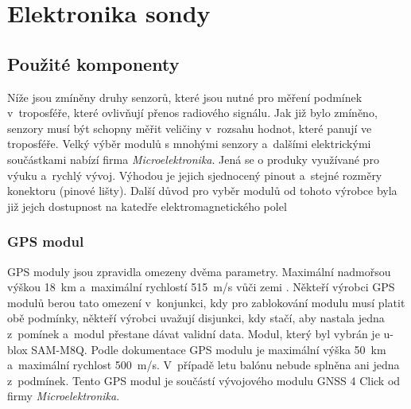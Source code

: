 \documentclass[twoside]{ctuthesis}
\theoremstyle{plain}
\theoremstyle{definition}
\theoremstyle{note}
\begin{document}
	\section{Elektronika sondy}

		\subsection{Použité komponenty}
		Níže jsou zmíněny druhy senzorů, které jsou nutné pro měření podmínek v~troposféře, které ovlivňují přenos radiového signálu. Jak již bylo zmíněno, senzory musí být schopny měřit veličiny v~rozsahu hodnot, které panují ve troposféře. Velký výběr modulů s mnohými senzory a~dalšími elektrickými součástkami nabízí firma \textit{Microelektronika}. Jená se o produky využívané pro výuku a~rychlý vývoj. Výhodou je jejich sjednocený pinout a~stejné rozměry konektoru (pinové lišty). Další důvod pro vyběr modulů od tohoto výrobce byla již jejch dostupnost na katedře elektromagnetického polel

			\subsubsection{GPS modul}
			GPS moduly jsou zpravidla omezeny dvěma parametry. Maximální nadmořsou výškou 18~km a~maximální rychlostí 515~m/s vůči zemi . Někteří výrobci GPS modulů berou tato omezení v~konjunkci, kdy pro zablokování modulu musí platit obě podmínky, někteří výrobci uvažují  disjunkci, kdy stačí, aby nastala jedna z~pomínek a~modul přestane dávat validní data. Modul, který byl vybrán je u-blox SAM-M8Q. Podle dokumentace GPS modulu \cite{dsh_gps} je maximální výška 50~km a~maximální rychlost 500~m/s. V~případě letu balónu nebude splněna ani jedna z~podmínek. Tento GPS modul je součástí vývojového modulu GNSS 4 Click od firmy \textit{Microelektronika}.
\end{document}
